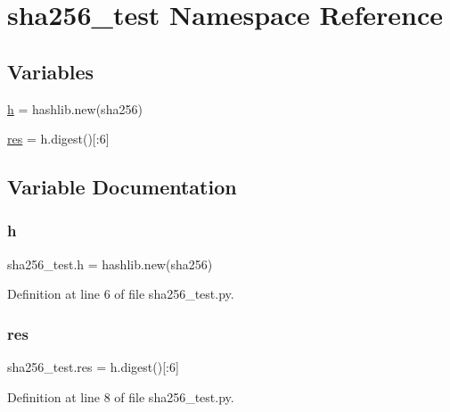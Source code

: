 \hypertarget{namespacesha256__test}{}\section{sha256\+\_\+test Namespace Reference}
\label{namespacesha256__test}
\subsection*{Variables}
\begin{DoxyCompactItemize}
\item 
\mbox{\hyperlink{namespacesha256__test_a9e6970f64376c4161d31fe5717c533bc}{h}} = hashlib.\+new(\textquotesingle{}sha256\textquotesingle{})
\item 
\mbox{\hyperlink{namespacesha256__test_a5fc8e677b8f139f063e53d27b5880f7e}{res}} = h.\+digest()\mbox{[}\+:6\mbox{]}
\end{DoxyCompactItemize}


\subsection{Variable Documentation}
\mbox{\label{namespacesha256__test_a9e6970f64376c4161d31fe5717c533bc}} 
\subsubsection{\texorpdfstring{h}{h}}
{\footnotesize\ttfamily sha256\+\_\+test.\+h = hashlib.\+new(\textquotesingle{}sha256\textquotesingle{})}



Definition at line 6 of file sha256\+\_\+test.\+py.

\mbox{\label{namespacesha256__test_a5fc8e677b8f139f063e53d27b5880f7e}} 
\subsubsection{\texorpdfstring{res}{res}}
{\footnotesize\ttfamily sha256\+\_\+test.\+res = h.\+digest()\mbox{[}\+:6\mbox{]}}



Definition at line 8 of file sha256\+\_\+test.\+py.

